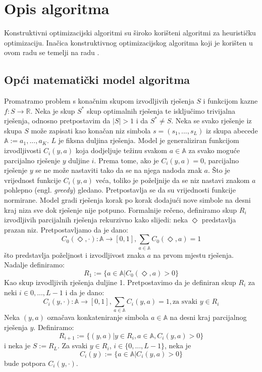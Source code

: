 \documentclass[times, utf8, zavrsni]{fer}
\begin{document}
\chapter{Opis algoritma}
\label{chap:opis_algoritma}
Konstruktivni optimizacijski algoritmi su široko korišteni algoritmi za heurističku optimizaciju. Inačica konstruktivnog optimizacijskog algoritma koji je korišten u ovom radu se temelji na radu \cite{DBLP:journals/tec/WuK14}.

\section{Opći matematički model algoritma}
Promatramo problem s konačnim skupom izvodljivih rješenja $S$ i funkcijom kazne $f: S \rightarrow \mathbb{R}$. Neka je skup $S^*$ skup optimalnih rješenja te isključimo trivijalna rješenja,
odnosno pretpostavim da $|S| > 1$ i da $S^* \neq S$. Neka se svako rješenje iz skupa $S$ može zapisati kao konačan niz simbola
$s = (s_1,...,s_L)$ iz skupa abecede $\mathbb{A} := {a_1,..., a_K}$. $L$ je fiksna duljina rješenja. Model je generaliziran funkcijom izvodljivosti $C_i(y, a)$ koja dodjeljuje težinu svakom $a \in \mathbb{A}$ za svako moguće parcijalno
rješenje $y$ duljine $i$. Prema tome, ako je $C_i(y, a) = 0$, parcijalno rješenje $y$ se ne može nastaviti tako da se na njega nadoda znak $a$. Što je vrijednost funkcije $C_i(y, a)$ veća, toliko je poželjnije da se niz nastavi znakom $a$ pohlepno (engl. \textit{greedy}) gledano. Pretpostavlja se da su vrijednosti funkcije normirane. Model gradi rješenja korak po korak dodajući nove simbole na desni kraj niza sve dok rješenje nije potpuno. Formalnije rečeno, definiramo skup $R_i$ izvodljivih parcijalnih rješenja rekurzivno kako slijedi:
neka $\Diamond$ predstavlja prazan niz. Pretpostavljamo da je dano:
$$
C_0(\Diamond, \cdot) :\mathbb{A} \rightarrow [0, 1],   \sum_{a \in \mathbb{A}} C_0(\Diamond, a) = 1
$$
što predstavlja poželjnost i izvodljivost znaka $a$ na prvom mjestu rješenja. Nadalje definiramo:
$$
R_1 := \{ a \in \mathbb{A} | C_0(\Diamond, a) > 0 \}
$$
Kao skup izvodljivih rješenja duljine 1. Pretpostavimo da je definiran skup $R_i$ za neki $i \in {0,..., L - 1}$ i da je dano:
$$
C_i(y, \cdot) :\mathbb{A} \rightarrow [0, 1], \sum_{a \in \mathbb{A}} C_i(y, a) = 1, \text{za svaki } y \in R_i
$$
Neka $(y, a)$ označava konkateniranje simbola $a \in \mathbb{A}$ na desni kraj parcijalnog rješenja $y$. Definiramo:
$$
R_{i+1} := \{ (y, a) | y \in R_i, a \in \mathbb{A}, C_i(y, a) > 0 \}
$$
i neka je $S := R_L$. Za svaki $y \in R_i$, $i \in \{0,..., L-1\}$, neka je
$$
C_i(y) := \{ a \in \mathbb{A} | C_i(y, a) > 0 \}
$$
bude potpora $C_i(y, \cdot)$. %
\end{document}
